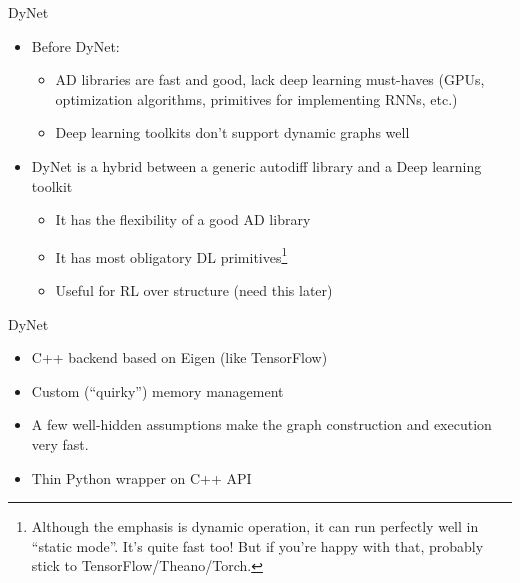 \documentclass[compress]{beamer}
\begin{document}
\begin{frame}{DyNet}
\begin{itemize}
\item Before DyNet:
  \begin{itemize}
    \item AD libraries are fast and good, lack deep learning must-haves (GPUs, optimization algorithms, primitives for implementing RNNs, etc.)
    \item Deep learning toolkits don't support dynamic graphs well
    \end{itemize}
\item DyNet is a hybrid between a generic autodiff library and a Deep
  learning toolkit
\begin{itemize}
  \item It has the flexibility of a good AD library
    \item It has most obligatory DL primitives\footnote{Although the
        emphasis is dynamic operation, it can run perfectly well in
        ``static mode''. It's quite fast too! But if you're happy with
        that, probably stick to TensorFlow/Theano/Torch.}
      \item Useful for RL over structure (need this later)
\end{itemize}
\end{itemize}
\end{frame}

\begin{frame}{DyNet}

\begin{itemize}
\item C++ backend based on Eigen (like TensorFlow)
\item Custom (``quirky'') memory management
\item A few well-hidden assumptions make the graph construction and execution very fast.
\item Thin Python wrapper on C++ API
\end{itemize}

\end{frame}
\end{document}
